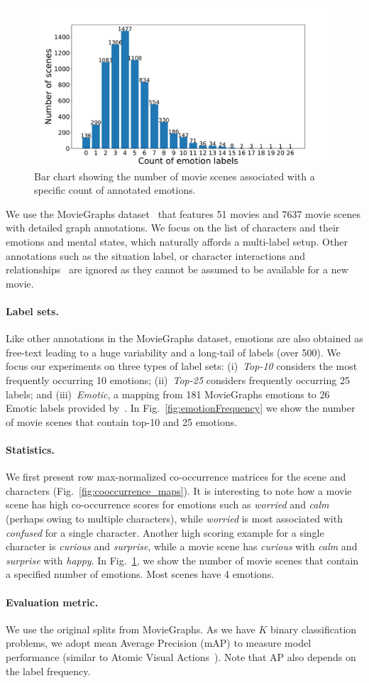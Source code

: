 \begin{figure}[t]
\centering
\includegraphics[width=0.7\linewidth]{Figures/emo_counts_in_ClipGraphs.pdf}
\vspace{-2mm}
\caption{Bar chart showing the number of movie scenes associated with a specific count of annotated emotions.}
\vspace{-5mm}
\label{fig:emotion_count_distribution}
\end{figure}

We use the MovieGraphs dataset~\cite{moviegraphs} that features 51 movies and 7637 movie scenes with detailed graph annotations.
We focus on the list of characters and their emotions and mental states, which naturally affords a multi-label setup.
Other annotations such as the situation label, or character interactions and relationships~\cite{lirec} are ignored as they cannot be assumed to be available for a new movie.

\paragraph{Label sets.}
Like other annotations in the MovieGraphs dataset, emotions are also obtained as free-text leading to a huge variability and a long-tail of labels (over 500).
We focus our experiments on three types of label sets:
(i)~\emph{Top-10} considers the most frequently occurring 10 emotions;
(ii)~\emph{Top-25} considers frequently occurring 25 labels; and
(iii)~\emph{Emotic}, a mapping from 181 MovieGraphs emotions to 26 Emotic labels provided by~\cite{affect2mm}. In Fig.~\ref{fig:emotionFrequency} we show the number of movie scenes that contain top-10 and 25 emotions.

\paragraph{Statistics.}
We first present row max-normalized co-occurrence matrices for the scene and characters (Fig.~\ref{fig:cooccurrence_maps}).
It is interesting to note how a movie scene has high co-occurrence scores for emotions such as \emph{worried} and \emph{calm} (perhaps owing to multiple characters), while \emph{worried} is most associated with \emph{confused} for a single character.
Another high scoring example for a single character is \emph{curious} and \emph{surprise},
while a movie scene has \emph{curious} with \emph{calm} and \emph{surprise} with \emph{happy}.
In Fig.~\ref{fig:emotion_count_distribution}, we show the number of movie scenes that contain a specified number of emotions.
Most scenes have 4 emotions.

\paragraph{Evaluation metric.}
We use the original splits from MovieGraphs.
As we have $K$ binary classification problems, we adopt mean Average Precision (mAP) to measure model performance (similar to Atomic Visual Actions~\cite{ava}).
Note that AP also depends on the label frequency.
